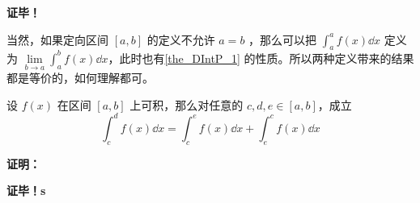 \textbf{证毕！} 

当然，如果定向区间 $[a,b]$ 的定义不允许 $a=b$ ，那么可以把 $\int_a^a f(x)\dd x$ 定义为 $\lim\limits_{b\rightarrow a}\int_a^b f(x)\dd x$，此时也有\autoref{the_DIntP_1} 的性质。所以两种定义带来的结果都是等价的，如何理解都可。

\begin{theorem}{}
设 $f(x)$ 在区间 $[a,b]$ 上可积，那么对任意的 $c,d,e\in[a,b]$，成立
\begin{equation}
\int_c^d f(x)\dd x=\int_c^e f(x)\dd x+\int_e^c f(x)\dd x
\end{equation}
\end{theorem}
\textbf{证明：}


\textbf{证毕！s}